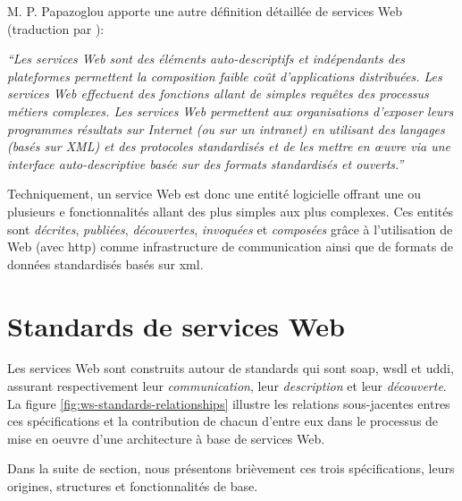   M. P. Papazoglou \cite{papazoglou2003service} apporte une autre
  définition détaillée de services Web (traduction par
  \cite{driss2011approche}):

  \textit{``Les services Web sont des éléments auto-descriptifs et
    indépendants des plateformes permettent la composition faible coût
    d’applications distribuées. Les services Web effectuent des
    fonctions allant de simples requêtes des processus métiers
    complexes. Les services Web permettent aux organisations d'exposer
    leurs programmes résultats sur Internet (ou sur un intranet) en
    utilisant des langages (basés sur XML) et des protocoles
    standardisés et de les mettre en œuvre via une interface
    auto-descriptive basée sur des formats standardisés et ouverts.''}

  Techniquement, un service Web est donc une entité logicielle offrant
  une ou plusieurs e fonctionnalités allant des plus simples aux plus
  complexes. Ces entités sont \emph{décrites}, \emph{publiées},
  \emph{découvertes}, \emph{invoquées} et \emph{composées} grâce à
  l'utilisation de Web (avec \acrshort{http}) comme infrastructure de
  communication ainsi que de formats de données standardisés basés sur
  \acrshort{xml}.


\section{Standards de services Web}
\label{sec:reference-arch}
Les services Web sont construits autour de standards qui sont
\acrshort{soap}, \acrshort{wsdl} et \acrshort{uddi}, assurant
respectivement leur \emph{communication}, leur \emph{description} et
leur \emph{découverte}. La figure \ref{fig:ws-standards-relationships}
illustre les relations sous-jacentes entres ces spécifications et la
contribution de chacun d'entre eux dans le processus de mise en oeuvre
d'une architecture à base de services Web.



Dans la suite de section, nous présentons brièvement ces trois
spécifications, leurs origines, structures et fonctionnalités de base.

